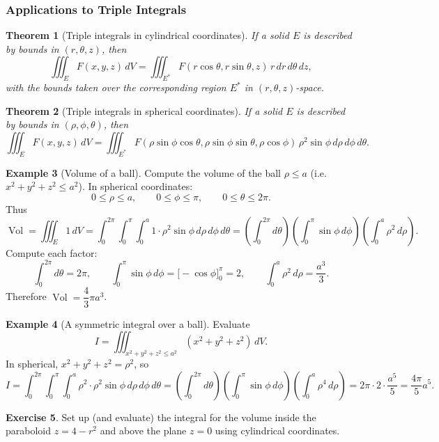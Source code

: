 \documentclass[12pt]{article}
\numberwithin{equation}{section}
\theoremstyle{plain}
\newtheorem{theorem}{Theorem}[section]
\theoremstyle{definition}
\newtheorem{example}[theorem]{Example}
\newtheorem{exercise}[theorem]{Exercise}
\theoremstyle{remark}
\begin{document}
\subsubsection{Applications to Triple Integrals}

\begin{theorem}[Triple integrals in cylindrical coordinates]\label{thm:triple-cyl}
If a solid $E$ is described by bounds in $(r,\theta,z)$, then
\[
\iiint_E F(x,y,z)\,dV
=
\iiint_{E^\ast} F(r\cos\theta,r\sin\theta,z)\, r\,dr\,d\theta\,dz,
\]
with the bounds taken over the corresponding region $E^\ast$ in $(r,\theta,z)$-space.
\end{theorem}

\begin{theorem}[Triple integrals in spherical coordinates]\label{thm:triple-sph}
If a solid $E$ is described by bounds in $(\rho,\phi,\theta)$, then
\[
\iiint_E F(x,y,z)\,dV
=
\iiint_{E^\ast} F(\rho\sin\phi\cos\theta,\rho\sin\phi\sin\theta,\rho\cos\phi)\,
\rho^2\sin\phi\,d\rho\,d\phi\,d\theta.
\]
\end{theorem}

\begin{example}[Volume of a ball]\label{ex:ball-volume}
Compute the volume of the ball $\rho\le a$ (i.e.\ $x^2+y^2+z^2\le a^2$).
In spherical coordinates:
\[
0\le \rho\le a,\qquad 0\le \phi\le \pi,\qquad 0\le \theta\le 2\pi.
\]
Thus
\[
\operatorname{Vol}=\iiint_E 1\,dV
=\int_{0}^{2\pi}\int_{0}^{\pi}\int_{0}^{a} 1\cdot \rho^2\sin\phi\,d\rho\,d\phi\,d\theta
=\left(\int_{0}^{2\pi}d\theta\right)\left(\int_{0}^{\pi}\sin\phi\,d\phi\right)\left(\int_{0}^{a}\rho^2\,d\rho\right).
\]
Compute each factor:
\[
\int_{0}^{2\pi}d\theta=2\pi,\qquad
\int_{0}^{\pi}\sin\phi\,d\phi=\big[-\cos\phi\big]_{0}^{\pi}=2,\qquad
\int_{0}^{a}\rho^2\,d\rho=\frac{a^3}{3}.
\]
Therefore $\operatorname{Vol}=\dfrac{4}{3}\pi a^3$.
\end{example}

\begin{example}[A symmetric integral over a ball]
Evaluate
\[
I=\iiint_{x^2+y^2+z^2\le a^2} (x^2+y^2+z^2)\,dV.
\]
In spherical, $x^2+y^2+z^2=\rho^2$, so
\[
I=\int_{0}^{2\pi}\int_{0}^{\pi}\int_{0}^{a} \rho^2\cdot \rho^2\sin\phi\,d\rho\,d\phi\,d\theta
=\left(\int_{0}^{2\pi}d\theta\right)\left(\int_{0}^{\pi}\sin\phi\,d\phi\right)\left(\int_{0}^{a}\rho^4\,d\rho\right)
=2\pi\cdot 2\cdot \frac{a^5}{5}
=\frac{4\pi}{5}a^5.
\]
\end{example}

\begin{exercise}
Set up (and evaluate) the integral for the volume inside the paraboloid $z=4-r^2$ and above the plane $z=0$ using cylindrical coordinates.
\end{exercise}
\end{document}
